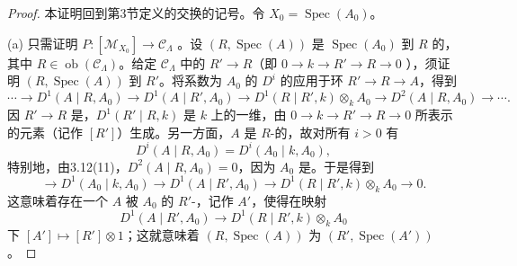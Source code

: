 \begin{proof}
本证明回到第3节定义的交换的记号。令 $X_0=\operatorname{Spec}(A_0)$。

(a) 只需证明 $P:[\mathcal M_{X_0}]\to\mathcal C_\Lambda$ 。设 $(R,\operatorname{Spec}(A))$ 是 $\operatorname{Spec}(A_0)$ 到 $R$ 的，其中 $R\in\operatorname{ob}(\mathcal C_\Lambda)$。给定 $\mathcal C_\Lambda$ 中的 $R'\to R$（即 $0\to k\to R'\to R\to0$ ），须证明 $(R,\operatorname{Spec}(A))$ 到 $R'$。将系数为 $A_0$ 的 $D^i$ 的应用于环 $R'\to R\to A$，得到
\[
\cdots\longrightarrow D^1(A\mid R,A_0)\longrightarrow D^1(A\mid R',A_0)
\longrightarrow D^1(R\mid R',k)\otimes_k A_0
\longrightarrow D^2(A\mid R,A_0)\longrightarrow\cdots.
\]
因 $R'\to R$ 是，$D^1(R'\mid R,k)$ 是 $k$ 上的一维，由 $0\to k\to R'\to R\to0$ 所表示的元素（记作 $[R']$）生成。另一方面，$A$ 是 $R$-的，故对所有 $i>0$ 有
\[
D^i(A\mid R,A_0)=D^i(A_0\mid k,A_0),
\]
特别地，由3.12(11)，$D^2(A\mid R,A_0)=0$，因为 $A_0$ 是。于是得到
\[
\longrightarrow D^1(A_0\mid k,A_0)\longrightarrow D^1(A\mid R',A_0)
\longrightarrow D^1(R\mid R',k)\otimes_k A_0\longrightarrow0.
\]
这意味着存在一个 $A$ 被 $A_0$ 的 $R'$-，记作 $A'$，使得在映射
\[
D^1(A\mid R',A_0)\longrightarrow D^1(R\mid R',k)\otimes_k A_0
\]
下 $[A']\mapsto[R']\otimes1$；这就意味着 $(R,\operatorname{Spec}(A))$ 为 $(R',\operatorname{Spec}(A'))$。


\end{proof}
